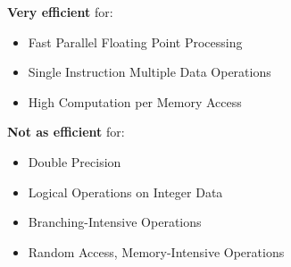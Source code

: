 \textbf{Very efficient} for:
\begin{itemize}
    \item Fast Parallel Floating Point Processing
    \item Single Instruction Multiple Data Operations
    \item High Computation per Memory Access
\end{itemize}

\textbf{Not as efficient} for:
\begin{itemize}
    \item Double Precision
    \item Logical Operations on Integer Data
    \item Branching-Intensive Operations
    \item Random Access, Memory-Intensive Operations
\end{itemize}